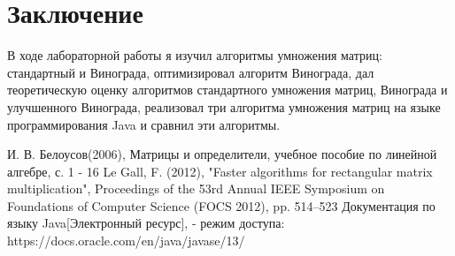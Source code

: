 \documentclass[12pt]{report}
\begin{document}
\chapter*{Заключение}
В ходе лабораторной работы я изучил алгоритмы умножения матриц: стандартный и Винограда, оптимизировал алгоритм Винограда, дал теоретическую оценку алгоритмов стандартного умножения матриц, Винограда и улучшенного Винограда, реализовал три алгоритма умножения матриц на языке программирования Java и сравнил эти алгоритмы.

 \begin{thebibliography}{3}
И. В. Белоусов(2006), Матрицы и определители, учебное пособие по линейной алгебре, с. 1 - 16
Le Gall, F. (2012), "Faster algorithms for rectangular matrix multiplication", Proceedings of the 53rd Annual IEEE Symposium on Foundations of Computer Science (FOCS 2012), pp. 514–523
Документация по языку Java[Электронный ресурс], - режим доступа: https://docs.oracle.com/en/java/javase/13/
\end{thebibliography}
\end{document}
